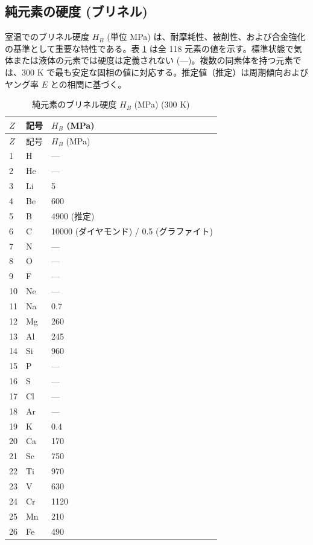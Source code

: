\documentclass[11pt,a4paper]{article}
\theoremstyle{remark}
\begin{document}
	\subsection{純元素の硬度 (ブリネル)}
	\label{subsec:hardness}
	
	室温でのブリネル硬度 \(H_B\) (単位 MPa) は、耐摩耗性、被削性、および合金強化の基準として重要な特性である。表 \ref{tab:hardness-all} は全 118 元素の値を示す。標準状態で気体または液体の元素では硬度は定義されない (—)。複数の同素体を持つ元素では、300 K で最も安定な固相の値に対応する。推定値（推定）は周期傾向およびヤング率 \(E\) との相関に基づく。
	
	\begin{longtable}{p{0.6cm}p{1.2cm}p{2.5cm}}
		\caption{純元素のブリネル硬度 \(H_B\) (MPa) (300 K)} \label{tab:hardness-all} \\
		\toprule
		\(Z\) & 記号 & \(H_B\) (MPa) \\
		\midrule
		\endfirsthead
		\toprule
		\(Z\) & 記号 & \(H_B\) (MPa) \\
		\midrule
		\endhead
		1  & H  & — \\
		2  & He & — \\
		3  & Li & 5 \\
		4  & Be & 600 \\
		5  & B  & 4900 (推定) \\
		6  & C  & 10000 (ダイヤモンド) / 0.5 (グラファイト) \\
		7  & N  & — \\
		8  & O  & — \\
		9  & F  & — \\
		10 & Ne & — \\
		11 & Na & 0.7 \\
		12 & Mg & 260 \\
		13 & Al & 245 \\
		14 & Si & 960 \\
		15 & P  & — \\
		16 & S  & — \\
		17 & Cl & — \\
		18 & Ar & — \\
		19 & K  & 0.4 \\
		20 & Ca & 170 \\
		21 & Sc & 750 \\
		22 & Ti & 970 \\
		23 & V  & 630 \\
		24 & Cr & 1120 \\
		25 & Mn & 210 \\
		26 & Fe & 490 \\

\end{longtable}
\end{document}
